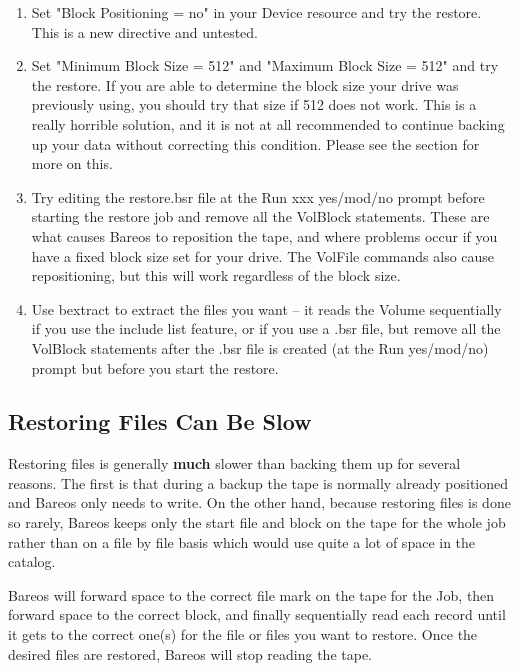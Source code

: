 \begin{enumerate}
\item Set "Block Positioning = no" in your Device resource  and try the
   restore. This is a new directive and untested.

\item Set "Minimum Block Size = 512" and "Maximum  Block Size = 512" and
   try the restore.  If you are able to determine the block size your drive
   was previously using, you should try that size if 512 does not work.
   This is a really horrible solution, and it is not at all recommended
   to continue backing up your data without correcting this condition.
   Please see the  section for more on this.

\item Try editing the restore.bsr file at the Run xxx yes/mod/no prompt
   before starting the restore job and remove all the VolBlock statements.
   These are what causes Bareos to reposition the tape, and where problems
   occur if you have a fixed block size set for your drive.  The VolFile
   commands also cause repositioning, but this will work regardless of the
   block size.

\item Use bextract to extract the files you want -- it reads the  Volume
   sequentially if you use the include list feature, or if you use a .bsr
   file, but remove all the VolBlock statements after the .bsr file is
   created (at the Run yes/mod/no) prompt but before you start the restore.
\end{enumerate}


\subsection{Restoring Files Can Be Slow}


Restoring files is generally {\bf much} slower than backing them up for several
reasons. The first is that during a backup the tape is normally already
positioned and Bareos only needs to write. On the other hand, because restoring
files is done so rarely, Bareos keeps only the start file and block on the
tape for the whole job rather than on a file by file basis which would use
quite a lot of space in the catalog.

Bareos will forward space to the correct file mark on the tape for the Job,
then forward space to the correct block, and finally sequentially read each
record until it gets to the correct one(s) for the file or files you want to
restore. Once the desired files are restored, Bareos will stop reading the
tape.

